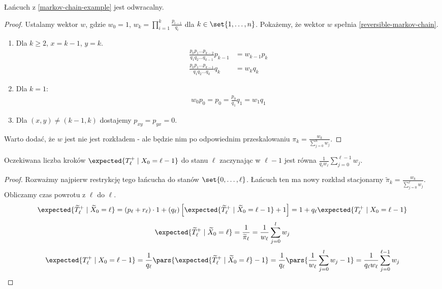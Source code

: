 \begin{lemma}
	Łańcuch z \ref{markov-chain-example} jest odwracalny.
\end{lemma}
\begin{proof}
	Ustalamy wektor \(w\), gdzie \(w_0 = 1\), \(w_k = \prod_{i=1}^k \frac{p_{i-1}}{q_i}\) dla \(k \in \set{1, \dots, n}\).
	Pokażemy, że wektor \(w\) spełnia \ref{reversible-markov-chain}.

	\begin{enumerate}
		\item Dla \(k \geq 2\), \(x = k-1\), \(y = k\).
		      \begin{align*}
			      \frac{p_0p_1\dots p_{k-2}}{q_1q_2\dots q_{k-1}}p_{k-1} & = w_{k-1}p_k \\
			      \frac{p_0p_1\dots p_{k-1}}{q_1q_2\dots q_k}q_k         & = w_kq_k
		      \end{align*}
		\item Dla \(k = 1\):
		      \begin{align*}
			      w_0p_0 = p_0 = \frac{p_0}{q_1}q_1 = w_1q_1
		      \end{align*}
		\item Dla \((x,y) \neq (k-1, k)\) dostajemy \(p_{xy} = p_{yx} = 0\).
	\end{enumerate}

	Warto dodać, że \(w\) jest nie jest rozkładem - ale będzie nim po odpowiednim przeskalowaniu \(\pi_k = \frac{w_k}{\sum_{j=0}^n w_j}\).
\end{proof}

\begin{theorem}
	Oczekiwana liczba kroków \(\expected{T^+_\ell \mid X_0 = \ell - 1}\) do stanu \(\ell\) zaczynając w \(\ell - 1\) jest równa \(\frac{1}{q_\ell w_\ell}\sum_{j=0}^{\ell-1}w_j\).
\end{theorem}
\begin{proof}
	Rozważmy najpierw restrykcję tego łańcucha do stanów \(\set{0, \dots, \ell}\). Łańcuch ten ma nowy rozkład stacjonarny \(\widetilde{\pi}_k = \frac{w_k}{\sum_{j=0}^\ell w_j}\).
	Obliczamy czas powrotu z \(\ell\) do \(\ell\).
	\[
		\expected{\widetilde{T}^+_\ell \mid \widetilde{X}_0 = \ell} = (p_\ell + r_\ell) \cdot 1 + (q_\ell)\left[\expected{\widetilde{T}^+_\ell \mid \widetilde{X}_0 = \ell-1} + 1\right] = 1 + q_\ell \expected{T_\ell^+ \mid X_0 = \ell - 1}
	\]
	\[
		\expected{\widetilde{T}^+_\ell \mid \widetilde{X}_0 = \ell} = \frac{1}{\widetilde{\pi}_\ell} = \frac{1}{w_\ell}\sum_{j=0}^l w_j
	\]
	\[
		\expected{T_\ell^+ \mid X_0 = \ell - 1} = \frac{1}{q_\ell}\pars{\expected{\widetilde{T}^+_\ell \mid \widetilde{X}_0 = \ell} - 1} = \frac{1}{q_\ell}\pars{\frac{1}{w_\ell}\sum_{j=0}^l w_j - 1} = \frac{1}{q_\ell w_\ell}\sum_{j=0}^{\ell-1}w_j
	\]
\end{proof}

